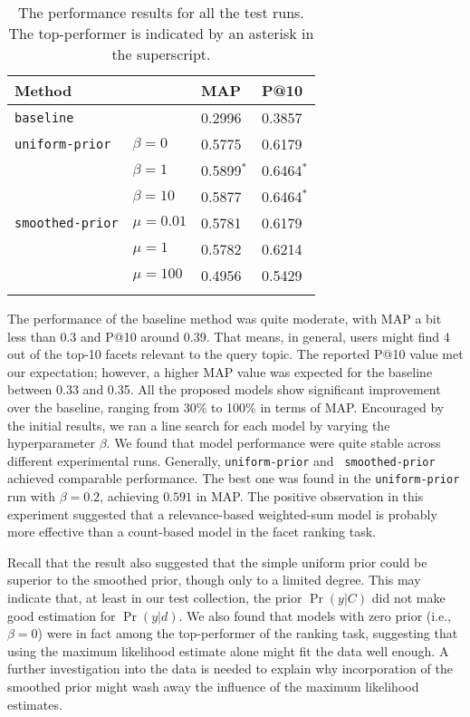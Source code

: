 \begin{table}[ht!]
  \centering
  \begin{tabular}{llll}
    Method & & MAP & P@10 \\
    \hline
    {\tt baseline} & & 0.2996 & 0.3857 \\
    {\tt uniform-prior} & $\beta = 0$ & 0.5775 & 0.6179\\
    & $\beta = 1$ & 0.5899$^*$ & 0.6464$^*$ \\
    & $\beta = 10$ & 0.5877 & 0.6464$^*$ \\
    {\tt smoothed-prior} & $\mu = 0.01$ & 0.5781 & 0.6179 \\
    & $\mu = 1$ & 0.5782 & 0.6214 \\
    & $\mu = 100$ & 0.4956 & 0.5429 \\
    \\
  \end{tabular}
  \caption{The performance results for all the test runs.  The top-performer is indicated by an asterisk in the superscript.}
  \label{t:performance}
\end{table}

The performance of the baseline method was quite moderate, with MAP a bit less
than 0.3 and P@10 around 0.39.  That means, in general, users might find 4 out
of the top-10 facets relevant to the query topic.  The reported P@10 value met
our expectation; however, a higher MAP value was expected for the baseline
between 0.33 and 0.35.  All the proposed models show significant improvement
over the baseline, ranging from 30\% to 100\% in terms of MAP.  Encouraged by
the initial results, we ran a line search for each model by varying the
hyperparameter $\beta$.  We found that model performance were quite stable
across different experimental runs.  Generally, {\tt uniform-prior} and {\tt
smoothed-prior} achieved comparable performance.  The best one was found in the
{\tt uniform-prior} run with $\beta = 0.2$, achieving $0.591$ in MAP.  The
positive observation in this experiment suggested that a relevance-based
weighted-sum model is probably more effective than a count-based model in the
facet ranking task.  

Recall that the result also suggested that the simple uniform prior could be 
superior to the smoothed prior, though only to a limited degree.  This may
indicate that, at least in our test collection, the prior $\Pr(y|C)$ did not
make good estimation for $\Pr(y|d)$.  We also found that models with
zero prior (i.e., $\beta = 0$) were in fact among the top-performer of the
ranking task, suggesting that using the maximum likelihood estimate alone might
fit the data well enough.  A further investigation into the data is needed to
explain why incorporation of the smoothed prior might wash away the influence
of the maximum likelihood estimates.

